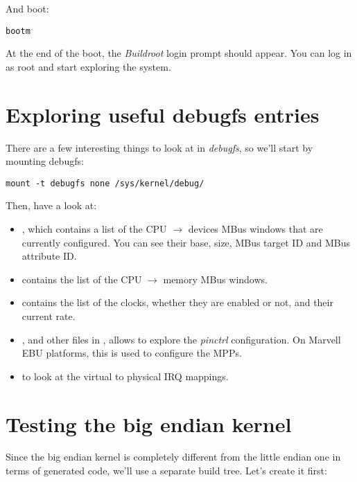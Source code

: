 And boot:

\begin{verbatim}
bootm
\end{verbatim}

At the end of the boot, the {\em Buildroot} login prompt should
appear. You can log in as root and start exploring the system.

\section{Exploring useful debugfs entries}

There are a few interesting things to look at in {\em debugfs}, so
we'll start by mounting debugfs:

\begin{verbatim}
mount -t debugfs none /sys/kernel/debug/
\end{verbatim}

Then, have a look at:

\begin{itemize}
\item {}, which contains a
  list of the CPU $\rightarrow$ devices MBus windows that are
  currently configured. You can see their base, size, MBus target ID
  and MBus attribute ID.
\item {} contains the list of
  the CPU $\rightarrow$ memory MBus windows.
\item {} contains the list of
  the clocks, whether they are enabled or not, and their current rate.
\item
  ,
  and other files in
  , allows to
  explore the {\em pinctrl} configuration. On Marvell EBU platforms,
  this is used to configure the MPPs.
\item {} to look at the virtual to
  physical IRQ mappings.
\end{itemize}

\section{Testing the big endian kernel}

Since the big endian kernel is completely different from the little
endian one in terms of generated code, we'll use a separate build
tree. Let's create it first:

